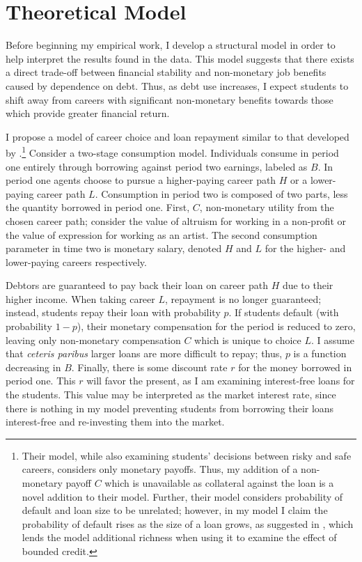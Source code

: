\documentclass[12pt]{article}
\begin{document}
	\section{Theoretical Model}
	
	Before beginning my empirical work, I develop a structural model in order to help interpret the results found in the data. This model suggests that there exists a direct trade-off between financial stability and non-monetary job benefits caused by dependence on debt. Thus, as debt use increases, I expect students to shift away from careers with significant non-monetary benefits towards those which provide greater financial return.

	I propose a model of career choice and loan repayment similar to that developed by \textcite{abraham2018}.\footnote{Their model, while also examining students' decisions between risky and safe careers, considers only monetary payoffs. Thus, my addition of a non-monetary payoff $C$ which is unavailable as collateral against the loan is a novel addition to their model. Further, their model considers probability of default and loan size to be unrelated; however, in my model I claim the probability of default rises as the size of a loan grows, as suggested in \textcite{dynarski2015}, which lends the model additional richness when using it to examine the effect of bounded credit.} 
	Consider a two-stage consumption model. Individuals consume in period one entirely through borrowing against period two earnings, labeled as $B$. In period one agents choose to pursue a higher-paying career path $H$ or a lower-paying career path $L$. Consumption in period two is composed of two parts, less the quantity borrowed in period one. First, $C$, non-monetary utility from the chosen career path; consider the value of altruism for working in a non-profit or the value of expression for working as an artist. The second consumption parameter in time two is monetary salary, denoted $H$ and $L$ for the higher- and lower-paying careers respectively.
	
	Debtors are guaranteed to pay back their loan on career path $H$ due to their higher income. When taking career $L$, repayment is no longer guaranteed; instead, students repay their loan with probability $p$. If students default (with probability $1 - p$), their monetary compensation for the period is reduced to zero, leaving only non-monetary compensation $C$ which is unique to choice $L$. I assume that \emph{ceteris paribus} larger loans are more difficult to repay; thus, $p$ is a function decreasing in $B$. Finally, there is some discount rate $r$ for the money borrowed in period one. This $r$ will favor the present, as I am examining interest-free loans for the students. This value may be interpreted as the market interest rate, since there is nothing in my model preventing students from borrowing their loans interest-free and re-investing them into the market. 
	
\end{document}
